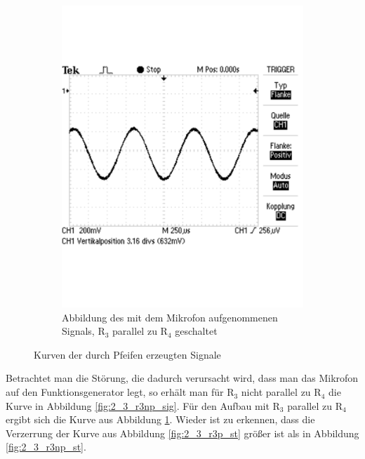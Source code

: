 \documentclass[12pt,a4paper]{article}
\begin{document}
\begin{figure}[H]
\begin{subfigure}[tb]{0.48\textwidth}
                \includegraphics[trim = 0cm 0cm 0cm 3cm , clip , width=\textwidth , scale = 0.4]{2_3_r3p_sig.pdf}
                \caption[Abbildung des mit dem Mikrofon aufgenommenen Signals am Oszilloskop, R$_3$ parallel zu R$_4$ geschaltet]{Abbildung des mit dem Mikrofon aufgenommenen Signals, R$_3$ parallel zu R$_4$ geschaltet}
  				\label{fig:2_3_r3p_sig}
        \end{subfigure}
        \caption{Kurven der durch Pfeifen erzeugten Signale}
        \label{fig:2_3_sin_vergleich}
\end{figure}



Betrachtet man die Störung, die dadurch verursacht wird, dass man das Mikrofon auf den Funktionsgenerator legt, so erhält man für R$_3$ nicht parallel zu R$_4$ die Kurve in Abbildung \ref{fig:2_3_r3np_sig}. Für den Aufbau mit R$_3$ parallel zu R$_4$ ergibt sich die Kurve aus Abbildung \ref{fig:2_3_r3p_sig}. Wieder ist zu erkennen, dass die Verzerrung der Kurve aus Abbildung \ref{fig:2_3_r3p_st} größer ist als in Abbildung \ref{fig:2_3_r3np_st}.
\end{document}
